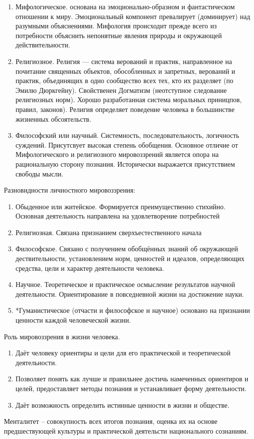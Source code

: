 \documentclass[12pt,a4paper]{book}
\begin{document}
\begin{enumerate}
	\item Мифологическое. основана на эмоционально-образном и фантастическом отношении к миру. Эмоциональный компонент превалирует (доминирует) над разумными объяснениями. Мифология происходит прежде всего из потребности объяснить непонятные явления природы и окружающей действительности.
	\item Религиозное. Религия --- система верований и практик, направленное на почитание священных объектов, обособленных и запретных, верований и практик, объединящих в одно сообщество всех тех, кто их разделяет (по Эмилю Дюркгейну).
	Свойственен Догматизм (неотступное следование религиозных норм). Хорошо разработанная система моральных приницпов, правил, законов). Религия определяет поведение человека в большинстве жизненных обсоятельств.
	\item Философский или научный. Системность, последовательность, логичность суждений. Присутсвует высокая степень обобщения. Основное отличие от Мифологического и религиозного мировоззрений является опора на рациональную сторону познания. Исторически выражается присутствием свободы мысли.
\end{enumerate}
Разновидности личностного мировоззрения:
\begin{enumerate}
	\item Обыденное или житейское. Формируется преимущественно стихийно. Основная деятельность направлена на удовлетворение потребностей
	\item Религиозная. Связана признанием сверхъестественного начала
	\item Философское. Связано с получением обобщённых знаний об окружающей дествительности, установлением норм, ценностей и идеалов, определяющих средства, цели и характер деятельности человека.
	\item Научное. Теоретическое и практическое осмысление результатов научной деятельности. Ориентирование в повседневной жизни на достижение науки.
	\item *Гуманистическое (отчасти и философское и научное) основано на признании ценности каждой человеческой жизни.
\end{enumerate}
Роль мировоззрения в жизни человека.
\begin{enumerate}
	\item Даёт человеку ориентиры и цели для его практической и теоретической деятельности.
	\item Позволяет понять как лучше и правильнее достичь намеченных ориентиров и целей, предоставляет методы познания и устанавливает форму деятельности.
	\item Даёт возможность определить истинные ценности в жизни и обществе.
\end{enumerate}
Менталитет -- совокупность всех итогов познания, оценка их на основе предшествующей культуры и практической деятельсти национального сознаниям. 
\end{document}
